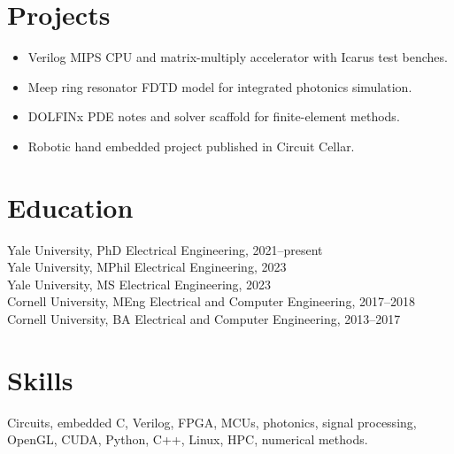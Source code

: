 \documentclass[10pt]{article}
\begin{document}
\section{Projects}
\begin{itemize}
\item Verilog MIPS CPU and matrix-multiply accelerator with Icarus test benches.
\item Meep ring resonator FDTD model for integrated photonics simulation.
\item DOLFINx PDE notes and solver scaffold for finite-element methods.
\item Robotic hand embedded project published in Circuit Cellar.
\end{itemize}
\section{Education}
Yale University, PhD Electrical Engineering, 2021--present\\
Yale University, MPhil Electrical Engineering, 2023\\
Yale University, MS Electrical Engineering, 2023\\
Cornell University, MEng Electrical and Computer Engineering, 2017--2018\\
Cornell University, BA Electrical and Computer Engineering, 2013--2017
\section{Skills}
Circuits, embedded C, Verilog, FPGA, MCUs, photonics, signal processing,
OpenGL, CUDA, Python, C++, Linux, HPC, numerical methods.
\end{document}
